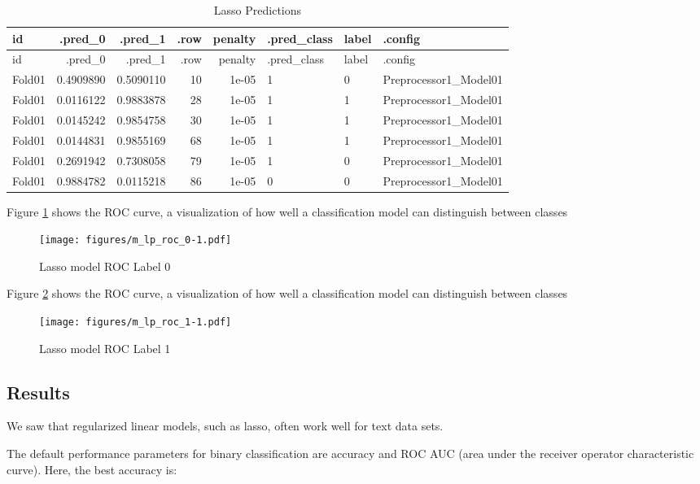 \documentclass[
]{article}
\begin{document}
\begin{longtable}[]{@{}lrrrrlll@{}}
\caption{Lasso Predictions\label{tbl:lasso_predictions}}\tabularnewline
\toprule
id & .pred\_0 & .pred\_1 & .row & penalty & .pred\_class & label &
.config \\
\midrule
\endfirsthead
\toprule
id & .pred\_0 & .pred\_1 & .row & penalty & .pred\_class & label &
.config \\
\midrule
\endhead
Fold01 & 0.4909890 & 0.5090110 & 10 & 1e-05 & 1 & 0 &
Preprocessor1\_Model01 \\
Fold01 & 0.0116122 & 0.9883878 & 28 & 1e-05 & 1 & 1 &
Preprocessor1\_Model01 \\
Fold01 & 0.0145242 & 0.9854758 & 30 & 1e-05 & 1 & 1 &
Preprocessor1\_Model01 \\
Fold01 & 0.0144831 & 0.9855169 & 68 & 1e-05 & 1 & 1 &
Preprocessor1\_Model01 \\
Fold01 & 0.2691942 & 0.7308058 & 79 & 1e-05 & 1 & 0 &
Preprocessor1\_Model01 \\
Fold01 & 0.9884782 & 0.0115218 & 86 & 1e-05 & 0 & 0 &
Preprocessor1\_Model01 \\
\bottomrule
\end{longtable}

Figure \ref{fig:model_8} shows the ROC curve, a visualization of how
well a classification model can distinguish between classes

\begin{figure}
\centering
\texttt{[image: figures/m\_lp\_roc\_0-1.pdf]}
\caption{Lasso model ROC Label 0\label{fig:model_8}}
\end{figure}

Figure \ref{fig:model_9} shows the ROC curve, a visualization of how
well a classification model can distinguish between classes

\begin{figure}
\centering
\texttt{[image: figures/m\_lp\_roc\_1-1.pdf]}
\caption{Lasso model ROC Label 1\label{fig:model_9}}
\end{figure}

\newpage

\hypertarget{results}{%
\subsection{Results}\label{results}}

We saw that regularized linear models, such as lasso, often work well
for text data sets.

The default performance parameters for binary classification are
accuracy and ROC AUC (area under the receiver operator characteristic
curve). Here, the best accuracy is:
\end{document}
